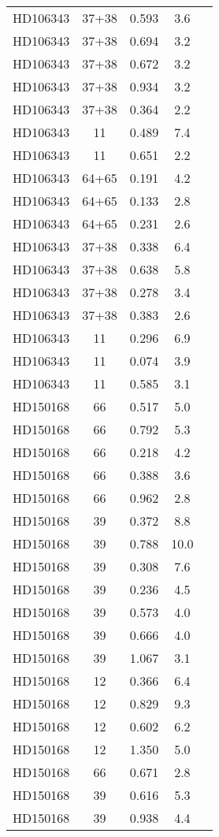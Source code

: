 \begin{table*}
\begin{tabular}{l c c c c}
HD106343 & 37+38 & 0.593 & 3.6\\ 
HD106343 & 37+38 & 0.694 & 3.2\\ 
HD106343 & 37+38 & 0.672 & 3.2\\ 
HD106343 & 37+38 & 0.934 & 3.2\\ 
HD106343 & 37+38 & 0.364 & 2.2\\ 
HD106343 & 11 & 0.489 & 7.4\\ 
HD106343 & 11 & 0.651 & 2.2\\ 
HD106343 & 64+65 & 0.191 & 4.2\\ 
HD106343 & 64+65 & 0.133 & 2.8\\ 
HD106343 & 64+65 & 0.231 & 2.6\\ 
HD106343 & 37+38 & 0.338 & 6.4\\ 
HD106343 & 37+38 & 0.638 & 5.8\\ 
HD106343 & 37+38 & 0.278 & 3.4\\ 
HD106343 & 37+38 & 0.383 & 2.6\\ 
HD106343 & 11 & 0.296 & 6.9\\ 
HD106343 & 11 & 0.074 & 3.9\\ 
HD106343 & 11 & 0.585 & 3.1\\ 
\hline
HD150168 & 66 & 0.517 & 5.0\\ 
HD150168 & 66 & 0.792 & 5.3\\ 
HD150168 & 66 & 0.218 & 4.2\\ 
HD150168 & 66 & 0.388 & 3.6\\ 
HD150168 & 66 & 0.962 & 2.8\\ 
HD150168 & 39 & 0.372 & 8.8\\ 
HD150168 & 39 & 0.788 & 10.0\\ 
HD150168 & 39 & 0.308 & 7.6\\ 
HD150168 & 39 & 0.236 & 4.5\\ 
HD150168 & 39 & 0.573 & 4.0\\ 
HD150168 & 39 & 0.666 & 4.0\\ 
HD150168 & 39 & 1.067 & 3.1\\ 
HD150168 & 12 & 0.366 & 6.4\\ 
HD150168 & 12 & 0.829 & 9.3\\ 
HD150168 & 12 & 0.602 & 6.2\\ 
HD150168 & 12 & 1.350 & 5.0\\ 
HD150168 & 66 & 0.671 & 2.8\\ 
HD150168 & 39 & 0.616 & 5.3\\ 
HD150168 & 39 & 0.938 & 4.4\\ 

\end{tabular}
\end{table*}
